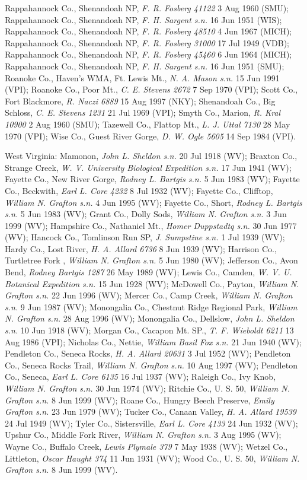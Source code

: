 \documentclass{article}
\begin{document}
Rappahannock Co., Shenandoah NP, \textit{F. R. Fosberg 41122} 3 Aug 1960 (SMU);
Rappahannock Co., Shenandoah NP, \textit{F. H. Sargent s.n.} 16 Jun 1951 (WIS);
Rappahannock Co., Shenandoah NP, \textit{F. R. Fosberg 48510} 4 Jun 1967 (MICH);
Rappahannock Co., Shenandoah NP, \textit{F. R. Fosberg 31000} 17 Jul 1949 (VDB);
Rappahannock Co., Shenandoah NP, \textit{F. R. Fosberg 45460} 6 Jun 1964 (MICH);
Rappahannock Co., Shenandoah NP, \textit{F. H. Sargent s.n.} 16 Jun 1951 (SMU);
Roanoke Co., Haven's WMA, Ft. Lewis Mt., \textit{N. A. Mason s.n.} 15 Jun 1991 (VPI);
Roanoke Co., Poor Mt., \textit{C. E. Stevens 2672} 7 Sep 1970 (VPI);
Scott Co., Fort Blackmore, \textit{R. Naczi 6889} 15 Aug 1997 (NKY);
Shenandoah Co., Big Schloss, \textit{C. E. Stevens 1231} 21 Jul 1969 (VPI);
Smyth Co., Marion, \textit{R. Kral 10900} 2 Aug 1960 (SMU);
Tazewell Co., Flattop Mt., \textit{L. J. Uttal 7130} 28 May 1970 (VPI);
Wise Co., Guest River Gorge, \textit{D. W. Ogle 5605} 14 Sep 1984 (VPI).

West Virginia:
Mamonon, \textit{John L. Sheldon s.n.} 20 Jul 1918 (WV);
Braxton Co., Strange Creek, \textit{W. V. University Biological Expedition s.n.} 17 Jun 1941 (WV);
Fayette Co., New River Gorge, \textit{Rodney L. Bartgis s.n.} 5 Jun 1983 (WV);
Fayette Co., Beckwith, \textit{Earl L. Core 4232} 8 Jul 1932 (WV);
Fayette Co., Clifftop, \textit{William N. Grafton s.n.} 4 Jun 1995 (WV);
Fayette Co., Short, \textit{Rodney L. Bartgis s.n.} 5 Jun 1983 (WV);
Grant Co., Dolly Sods, \textit{William N. Grafton s.n.} 3 Jun 1999 (WV);
Hampshire Co., Nathaniel Mt., \textit{Homer Duppstadtq s.n.} 30 Jun 1977 (WV);
Hancock Co., Tomlinson Run SP, \textit{J. Sumpstine s.n.} 1 Jul 1939 (WV);
Hardy Co., Lost River, \textit{H. A. Allard 6736} 8 Jun 1939 (WV);
Harrison Co., Turtletree Fork , \textit{William N. Grafton s.n.} 5 Jun 1980 (WV);
Jefferson Co., Avon Bend, \textit{Rodney Bartgis 1287} 26 May 1989 (WV);
Lewis Co., Camden, \textit{W. V. U. Botanical Expedition s.n.} 15 Jun 1928 (WV);
McDowell Co., Payton, \textit{William N. Grafton s.n.} 22 Jun 1996 (WV);
Mercer Co., Camp Creek, \textit{William N. Grafton s.n.} 9 Jun 1987 (WV);
Monongalia Co., Chestnut Ridge Regional Park, \textit{William N. Grafton s.n.} 28 Aug 1996 (WV);
Monongalia Co., Dellslow, \textit{John L. Sheldon s.n.} 10 Jun 1918 (WV);
Morgan Co., Cacapon Mt. SP., \textit{T. F. Wieboldt 6211} 13 Aug 1986 (VPI);
Nicholas Co., Nettie, \textit{William Basil Fox s.n.} 21 Jun 1940 (WV);
Pendleton Co., Seneca Rocks, \textit{H. A. Allard 20631} 3 Jul 1952 (WV);
Pendleton Co., Seneca Rocks Trail, \textit{William N. Grafton s.n.} 10 Aug 1997 (WV);
Pendleton Co., Seneca, \textit{Earl L. Core 6135} 16 Jul 1937 (WV);
Raleigh Co., Ivy Knob, \textit{William N. Grafton s.n.} 30 Jun 1974 (WV);
Ritchie Co., U. S. 50, \textit{William N. Grafton s.n.} 8 Jun 1999 (WV);
Roane Co., Hungry Beech Preserve, \textit{Emily Grafton s.n.} 23 Jun 1979 (WV);
Tucker Co., Canaan Valley, \textit{H. A. Allard 19539} 24 Jul 1949 (WV);
Tyler Co., Sistersville, \textit{Earl L. Core 4133} 24 Jun 1932 (WV);
Upshur Co., Middle Fork River, \textit{William N. Grafton s.n.} 3 Aug 1995 (WV);
Wayne Co., Buffalo Creek, \textit{Lewis Plymale 379} 7 May 1938 (WV);
Wetzel Co., Littleton, \textit{Oscar Haught 374} 11 Jun 1931 (WV);
Wood Co., U. S. 50, \textit{William N. Grafton s.n.} 8 Jun 1999 (WV).
\end{document}

